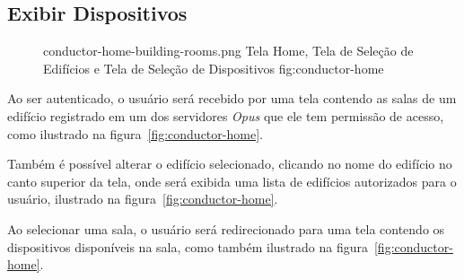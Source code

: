 \subsection{Exibir Dispositivos}

\begin{figure}[ht]
    {conductor-home-building-rooms.png}
    {Tela Home, Tela de Seleção de Edifícios e Tela de Seleção de Dispositivos}
    {fig:conductor-home}
\end{figure}

Ao ser autenticado, o usuário será recebido por uma tela contendo as salas de um edifício registrado em um dos servidores \emph{Opus}
que ele tem permissão de acesso, como ilustrado na figura~\ref{fig:conductor-home}.

Também é possível alterar o edifício selecionado, clicando no nome do edifício no canto superior da tela, onde será exibida uma lista de edifícios
autorizados para o usuário, ilustrado na figura~\ref{fig:conductor-home}.

Ao selecionar uma sala, o usuário será redirecionado para uma tela contendo os dispositivos disponíveis na sala, 
como também ilustrado na figura~\ref{fig:conductor-home}.